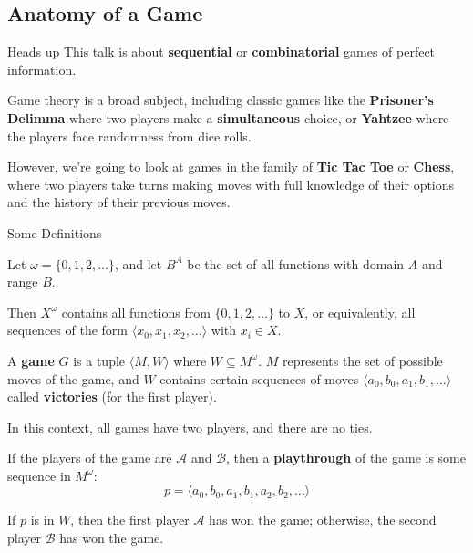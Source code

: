 \documentclass{beamer}
\theoremstyle{theorem}
\theoremstyle{definition}
\newcommand{\<}{\langle}
\renewcommand{\>}{\rangle}
\newcommand{\pl}[1]{\mathscr{#1}}
\newcommand{\vpause}{\pause\vspace{1em}}
\newcommand{\term}[1]{\textbf{#1}}
\begin{document}
\subsection{Anatomy of a Game}

\begin{frame}{Heads up}
  This talk is about \term{sequential} or \term{combinatorial} games
  of perfect information.

  \vpause

  Game theory is a broad subject, including classic games like the
  \term{Prisoner's Delimma} where two players make a \term{simultaneous}
  choice, or \term{Yahtzee} where the players face randomness from
  dice rolls.

  \vpause

  However, we're going to look at games in the family of \term{Tic Tac Toe}
  or \term{Chess}, where two players take turns making moves with full knowledge
  of their options and the history of their previous moves.
\end{frame}

\begin{frame}{Some Definitions}
  \begin{definition}
    Let $\omega=\{0,1,2,\dots\}$, and let $B^A$ be the set of all functions
    with domain $A$ and range $B$.

    Then $X^\omega$ contains all functions from $\{0,1,2,\dots\}$ to $X$, or
    equivalently, all sequences of the form $\<x_0,x_1,x_2,\dots\>$ with
    $x_i\in X$.
  \end{definition}
  \pause
  \begin{definition}
    A \term{game} $G$ is a tuple $\<M,W\>$ where $W\subseteq M^\omega$.
    $M$ represents the set of possible moves of the game, and $W$ contains
    certain sequences of moves $\<a_0,b_0,a_1,b_1,\dots\>$ called
    \term{victories} (for the first player).
  \end{definition}
\end{frame}

\begin{frame}
  In this context, all games have two players, and there are no ties.

  \vpause

  If the players of the game are $\pl A$ and $\pl B$, then a \term{playthrough}
  of the game is some sequence in $M^\omega$:
  \[
    p=\<a_0,b_0,a_1,b_1,a_2,b_2,\dots\>
  \]

  \pause

  If $p$ is in $W$, then the first player $\pl A$ has won the game; otherwise,
  the second player $\pl B$ has won the game.
\end{frame}
\end{document}
